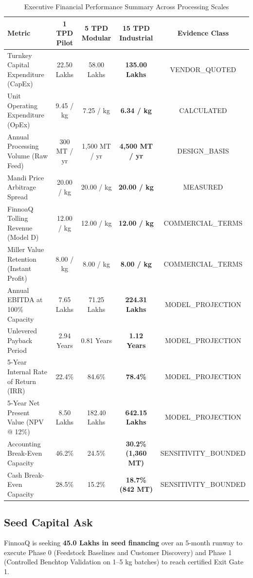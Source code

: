 \documentclass[10pt,a4paper]{article}
\newcommand{\inr}{\text{INR~}}
\begin{document}
\begin{table}[H]
\centering
\small
\caption{Executive Financial Performance Summary Across Processing Scales}
\label{tab:exec_metrics}
\begin{tabularx}{\linewidth}{Xcccc}
\toprule
\textbf{Metric} & \textbf{1 TPD Pilot} & \textbf{5 TPD Modular} & \textbf{15 TPD Industrial} & \textbf{Evidence Class} \\
\midrule
Turnkey Capital Expenditure (CapEx) & \inr 22.50 Lakhs & \inr 58.00 Lakhs & \textbf{\inr 135.00 Lakhs} & VENDOR\_QUOTED \\
Unit Operating Expenditure (OpEx) & \inr 9.45 / kg & \inr 7.25 / kg & \textbf{\inr 6.34 / kg} & CALCULATED \\
Annual Processing Volume (Raw Feed) & 300 MT / yr & 1,500 MT / yr & \textbf{4,500 MT / yr} & DESIGN\_BASIS \\
Mandi Price Arbitrage Spread & \inr 20.00 / kg & \inr 20.00 / kg & \textbf{\inr 20.00 / kg} & MEASURED \\
FinnoaQ Tolling Revenue (Model D) & \inr 12.00 / kg & \inr 12.00 / kg & \textbf{\inr 12.00 / kg} & COMMERCIAL\_TERMS \\
Miller Value Retention (Instant Profit) & \inr 8.00 / kg & \inr 8.00 / kg & \textbf{\inr 8.00 / kg} & COMMERCIAL\_TERMS \\
Annual EBITDA at 100\% Capacity & \inr 7.65 Lakhs & \inr 71.25 Lakhs & \textbf{\inr 224.31 Lakhs} & MODEL\_PROJECTION \\
Unlevered Payback Period & 2.94 Years & 0.81 Years & \textbf{1.12 Years} & MODEL\_PROJECTION \\
5-Year Internal Rate of Return (IRR) & 22.4\% & 84.6\% & \textbf{78.4\%} & MODEL\_PROJECTION \\
5-Year Net Present Value (NPV @ 12\%) & \inr 8.50 Lakhs & \inr 182.40 Lakhs & \textbf{\inr 642.15 Lakhs} & MODEL\_PROJECTION \\
Accounting Break-Even Capacity & 46.2\% & 24.5\% & \textbf{30.2\% (1,360 MT)} & SENSITIVITY\_BOUNDED \\
Cash Break-Even Capacity & 28.5\% & 15.2\% & \textbf{18.7\% (842 MT)} & SENSITIVITY\_BOUNDED \\
\bottomrule
\end{tabularx}
\end{table}

\subsection{Seed Capital Ask}
FinnoaQ is seeking \textbf{\inr 45.0 Lakhs in seed financing} over an 5-month runway to execute Phase 0 (Feedstock Baselines and Customer Discovery) and Phase 1 (Controlled Benchtop Validation on 1--5 kg batches) to reach certified Exit Gate 1.
\end{document}
